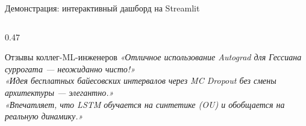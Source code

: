 \documentclass[11pt, aspectratio=169]{beamer}
\begin{document}
\begin{frame}[shrink=8]{Демонстрация: интерактивный дашборд на Streamlit}
\begin{columns}[T]
\begin{column}{0.47\textwidth}
      \medskip
      \begin{exampleblock}{Отзывы коллег-ML-инженеров}
        \scriptsize
        \textit{«Отличное использование Autograd для Гессиана
        суррогата — неожиданно чисто!»}\\[0.25em]
        \textit{«Идея бесплатных байесовских интервалов
        через MC Dropout без смены архитектуры — элегантно.»}\\[0.25em]
        \textit{«Впечатляет, что LSTM обучается на синтетике
        (OU) и обобщается на реальную динамику.»}
      \end{exampleblock}
    \end{column}
  \end{columns}
\end{frame}
\end{document}
